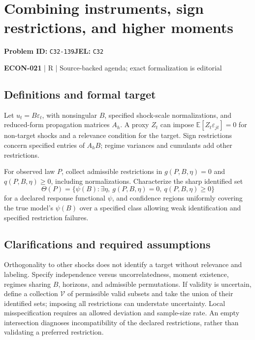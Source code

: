 \documentclass[11pt,a4paper]{article}
\begin{document}
\section*{Combining instruments, sign restrictions, and higher moments}
\textbf{Problem ID:} \texttt{C32-139}\quad \textbf{JEL:} \texttt{C32}\par
\label{problem:OP-0605}


\label{audited:ECON-021}

{\sffamily\small\color{muted}\textbf{ECON-021} | R | Source-backed agenda; exact formalization is editorial\par}

\subsection*{Definitions and formal target}

Let \(u_t=B\varepsilon_t\), with nonsingular \(B\), specified shock-scale normalizations, and reduced-form propagation matrices \(A_h\). A proxy \(Z_t\) can impose \(\mathbb E[Z_t\varepsilon_{jt}]=0\) for non-target shocks and a relevance condition for the target. Sign restrictions concern specified entries of \(A_hB\); regime variances and cumulants add other restrictions.

For observed law \(P\), collect admissible restrictions in \(g(P,B,\eta)=0\) and \(q(P,B,\eta)\geq0\), including normalizations. Characterize the sharp identified set
\[
 \Theta(P)=\{\psi(B):\exists\eta,\ g(P,B,\eta)=0,\ q(P,B,\eta)\geq0\}
\]
for a declared response functional \(\psi\), and confidence regions uniformly covering the true model's \(\psi(B)\) over a specified class allowing weak identification and specified restriction failures.

\subsection*{Clarifications and required assumptions}

Orthogonality to other shocks does not identify a target without relevance and labeling. Specify independence versus uncorrelatedness, moment existence, regimes sharing \(B\), horizons, and admissible permutations. If validity is uncertain, define a collection \(\mathcal V\) of permissible valid subsets and take the union of their identified sets; imposing all restrictions can understate uncertainty. Local misspecification requires an allowed deviation and sample-size rate. An empty intersection diagnoses incompatibility of the declared restrictions, rather than validating a preferred restriction.
\end{document}
